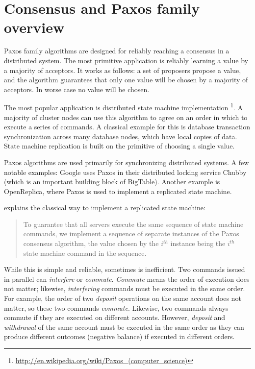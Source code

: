 \documentclass[english,11pt]{l4proj}
\begin{document}
\section{Consensus and Paxos family overview}
\label{sec:paxos-family}

Paxos family algorithms are designed for reliably reaching a consensus in a
distributed system. The most primitive application is reliably learning a value
by a majority of acceptors. It works as follows: a set of proposers propose a
value, and the algorithm guarantees that only one value will be chosen by a
majority of acceptors. In worse case no value will be chosen.


The most popular application is distributed state machine implementation
\footnote{\url{http://en.wikipedia.org/wiki/Paxos\_(computer\_science)}}. A
majority of cluster nodes can use this algorithm to agree on an order in which
to execute a series of commands. A classical example for this is database
transaction synchronization across many database nodes, which have local copies
of data. State machine replication is built on the primitive of choosing a
single value.

Paxos algorithms are used primarily for synchronizing distributed systems. A few
notable examples: Google uses Paxos in their distributed locking service
Chubby\cite{chubby} (which is an important building block of BigTable). Another
example is OpenReplica\cite{openreplica}, where Paxos is used to implement a
replicated state machine.

\cite{paxos-simple} explains the classical way to implement a replicated state
machine:

\begin{quote}
To guarantee that all servers execute the same sequence of state machine
commands, we implement a sequence of separate instances of the Paxos consensus
algorithm, the value chosen by the $i^{th}$ instance being the $i^{th}$ state
machine command in the sequence.
\end{quote}

While this is simple and reliable, sometimes is inefficient. Two commands issued
in parallel can \emph{interfere} or \emph{commute}. \emph{Commute} means the
order of execution does not matter; likewise, \emph{interfering} commands must
be executed in the same order. For example, the order of two \emph{deposit}
operations on the same account does not matter, so these two commands
\emph{commute}. Likewise, two commands always commute if they are executed on
different accounts. However, \emph{deposit} and \emph{withdrawal} of the same
account must be executed in the same order as they can produce different
outcomes (negative balance) if executed in different orders.
\end{document}
